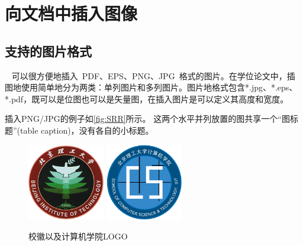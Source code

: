 \section{向文档中插入图像}
\label{sec:insertimage}

\subsection{支持的图片格式}
\label{sec:imageformat}

\XeTeX~ 可以很方便地插入~PDF、EPS、PNG、JPG~格式的图片。在学位论文中，插图地使用简单地分为两类：单列图片和多列图片。图片地格式包含*.jpg、*.eps、*.pdf，既可以是位图也可以是矢量图，在插入图片是可以定义其高度和宽度。

插入PNG/JPG的例子如\ref{fig:SRR}所示。
这两个水平并列放置的图共享一个``图标题''(table caption)，没有各自的小标题。

\begin{figure}[!htp]
  \centering
  \includegraphics[width=0.3\textwidth]{figures/BIT}
  \hspace{1cm}
  \includegraphics[width=0.3\textwidth]{figures/BIT-CS}
  \caption{校徽以及计算机学院LOGO}
\end{figure}

